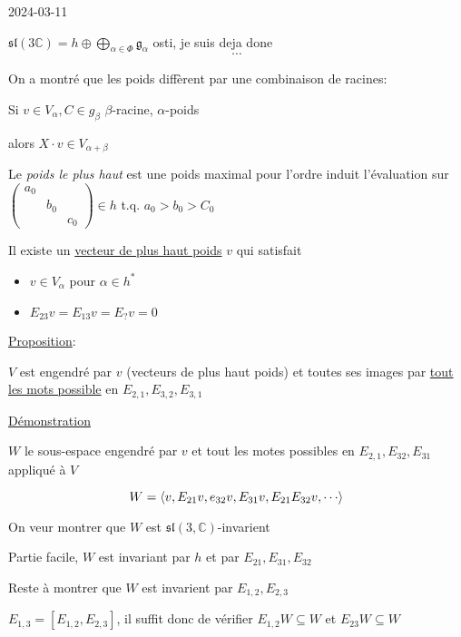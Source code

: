 


2024-03-11


\begin{tcolorbox}[title=Rappels]
	\(\mathfrak{sl}(3 \mathds{C}) = h \oplus \bigoplus_{\alpha\in \Phi} \mathfrak{g}_\alpha  \) 
	osti, je suis deja done 
\[ \dotsb \]

On a montré que les poids diffèrent par une combinaison de racines:

Si \(v \in V_{\alpha}, C \in g_{\beta}\) \(\beta\)-racine, \(\alpha\)-poids

alors \( X \cdot v \in V_{\alpha+\beta} \)

Le \textit{poids le plus haut} est une poids maximal pour l'ordre induit l'évaluation sur \(\begin{pmatrix} a_0 \\ & b_0 \\ & & c_0  \end{pmatrix} \in h\) t.q. \(a_0 > b_0 > C_0 \)

Il existe un \underline{vecteur de plus haut poids} \(v\) qui satisfait 

\begin{itemize}
	\item \(v \in V_{\alpha} \) pour \(\alpha \in h^{*}\)
	\item \(E_{23} v = E_{13} v = E_? v  = 0\)
\end{itemize}

\end{tcolorbox}

\underline{Proposition}:

\(V\) est engendré par \(v\) (vecteurs de plus haut poids) et toutes ses images par \underline{tout les mots possible} en \(E_{2,1}, E_{3,2}, E_{3,1} \) 

\underline{Démonstration}

\(W\) le sous-espace engendré par \(v\) et tout les motes possibles en \(E_{2,1}, E_{32}, E_{31}  \) appliqué à \(V\)


\[ W = \expval{v, E_{21} v, e_{32} v, E_{31} v, E_{21} E_{32} v, \dotsb} \]

On veur montrer que \(W\) est \(\mathfrak{sl}(3, \mathds{C})\)-invarient 

Partie facile, \(W\) est invariant par \(h\) et par \(E_{21} , E_{31}, E_{32} \)

Reste à montrer que \(W\) est invarient par \(E_{1,2} , E_{2,3} \)


\(E_{1,3} = [E_{1,2}, E_{2,3}] \), il suffit donc de vérifier \(E_{1,2} W \subseteq W\) et \(E_{23} W \subseteq W\)

